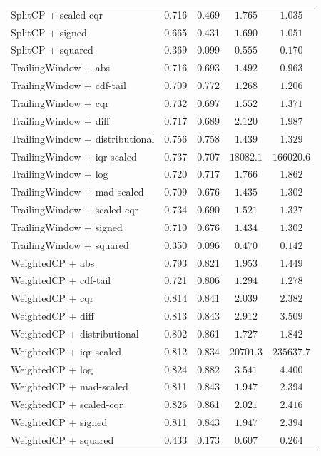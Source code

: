 \begin{longtable}{lcccc}
	SplitCP + scaled-cqr & 0.716 & 0.469 & $1.765$ & $1.035$ \\
	SplitCP + signed & 0.665 & 0.431 & $1.690$ & $1.051$ \\
	SplitCP + squared & 0.369 & 0.099 & $0.555$ & $0.170$ \\
	TrailingWindow + abs & 0.716 & 0.693 & $1.492$ & $0.963$ \\
	TrailingWindow + cdf-tail & 0.709 & 0.772 & $1.268$ & $1.206$ \\
	TrailingWindow + cqr & 0.732 & 0.697 & $1.552$ & $1.371$ \\
	TrailingWindow + diff & 0.717 & 0.689 & $2.120$ & $1.987$ \\
	TrailingWindow + distributional & 0.756 & 0.758 & $1.439$ & $1.329$ \\
	TrailingWindow + iqr-scaled & 0.737 & 0.707 & $18082.1$ & $166020.6$ \\
	TrailingWindow + log & 0.720 & 0.717 & $1.766$ & $1.862$ \\
	TrailingWindow + mad-scaled & 0.709 & 0.676 & $1.435$ & $1.302$ \\
	TrailingWindow + scaled-cqr & 0.734 & 0.690 & $1.521$ & $1.327$ \\
	TrailingWindow + signed & 0.710 & 0.676 & $1.434$ & $1.302$ \\
	TrailingWindow + squared & 0.350 & 0.096 & $0.470$ & $0.142$ \\
	WeightedCP + abs & 0.793 & 0.821 & $1.953$ & $1.449$ \\
	WeightedCP + cdf-tail & 0.721 & 0.806 & $1.294$ & $1.278$ \\
	WeightedCP + cqr & 0.814 & 0.841 & $2.039$ & $2.382$ \\
	WeightedCP + diff & 0.813 & 0.843 & $2.912$ & $3.509$ \\
	WeightedCP + distributional & 0.802 & 0.861 & $1.727$ & $1.842$ \\
	WeightedCP + iqr-scaled & 0.812 & 0.834 & $20701.3$ & $235637.7$ \\
	WeightedCP + log & 0.824 & 0.882 & $3.541$ & $4.400$ \\
	WeightedCP + mad-scaled & 0.811 & 0.843 & $1.947$ & $2.394$ \\
	WeightedCP + scaled-cqr & 0.826 & 0.861 & $2.021$ & $2.416$ \\
	WeightedCP + signed & 0.811 & 0.843 & $1.947$ & $2.394$ \\
	WeightedCP + squared & 0.433 & 0.173 & $0.607$ & $0.264$ \\
\end{longtable}

